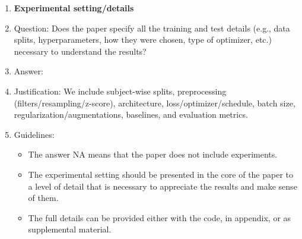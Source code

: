 \documentclass{article}
\begin{document}
\begin{enumerate}
\item {\bf Experimental setting/details}
    \item[] Question: Does the paper specify all the training and test details (e.g., data splits, hyperparameters, how they were chosen, type of optimizer, etc.) necessary to understand the results?
    \item[] Answer: \answerYes{}
    \item[] Justification: We include subject-wise splits, preprocessing (filters/resampling/z-score), architecture, loss/optimizer/schedule, batch size, regularization/augmentations, baselines, and evaluation metrics.
    \item[] Guidelines:
    \begin{itemize}
        \item The answer NA means that the paper does not include experiments.
        \item The experimental setting should be presented in the core of the paper to a level of detail that is necessary to appreciate the results and make sense of them.
        \item The full details can be provided either with the code, in appendix, or as supplemental material.
    \end{itemize}


\end{enumerate}
\end{document}
